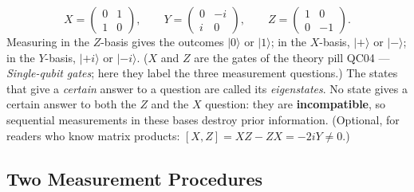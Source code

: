 \documentclass[a4paper,11pt]{article}
\providecommand{\ket}[1]{|{#1}\rangle}
\begin{document}
\begin{equation}
    X = \begin{pmatrix}0&1\\1&0\end{pmatrix},\qquad
    Y = \begin{pmatrix}0&-i\\i&0\end{pmatrix},\qquad
    Z = \begin{pmatrix}1&0\\0&-1\end{pmatrix}.
\end{equation}
Measuring in the $Z$-basis gives the outcomes $\ket{0}$ or $\ket{1}$; in the $X$-basis,
$\ket{+}$ or $\ket{-}$; in the $Y$-basis, $\ket{+i}$ or $\ket{-i}$. ($X$ and $Z$ are the
gates of the theory pill QC04 --- \textit{Single-qubit gates}; here they label the three
measurement questions.) The states that give a \emph{certain} answer to a question are
called its \emph{eigenstates}. No state gives a certain answer to both the $Z$ and the
$X$ question: they are \textbf{incompatible}, so sequential measurements in these bases
destroy prior information. (Optional, for readers who know matrix products:
$[X, Z] = XZ - ZX = -2iY \neq 0$.)

\subsection{Two Measurement Procedures}
\label{sec:procedures}
\end{document}
